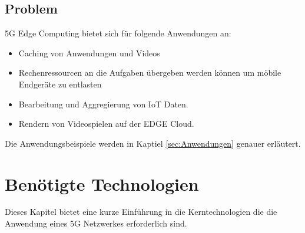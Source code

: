 \documentclass[runningheads]{llncs}
\numberwithin{figure}{section}
\begin{document}
\subsection{Problem}
\label{subsec:Problem}
5G Edge Computing bietet sich für folgende Anwendungen an:
\begin{itemize}
  \item Caching von Anwendungen und Videos
  \item Rechenressourcen an die Aufgaben übergeben werden können um möbile Endgeräte zu entlasten
  \item Bearbeitung und Aggregierung von IoT Daten.
  \item Rendern von Videospielen auf der EDGE Cloud.
\end{itemize}
Die Anwendungsbeispiele werden in Kaptiel \ref{sec:Anwendungen} genauer erläutert.
\newpage



\section{Benötigte Technologien}
\label{sec:Benötigte Technologien}
Dieses Kapitel bietet eine kurze Einführung in die Kerntechnologien die die Anwendung eines 5G Netzwerkes erforderlich sind.
\end{document}
